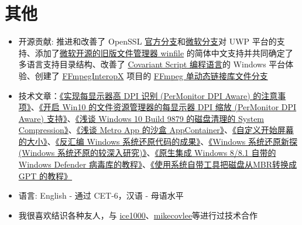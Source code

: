 \documentclass{resume}
\begin{document}
\section{其他}
\begin{itemize}[parsep=0.25ex]

  \item 开源贡献: 推进和改善了 OpenSSL \href{https://github.com/openssl/openssl/pulls?q=is:pr+author:MouriNaruto+}{官方分支}和\href{https://github.com/microsoft/openssl/pulls?q=is:pr+author:MouriNaruto+}{微软分支}对 UWP 平台的支持、添加了\href{https://github.com/microsoft/winfile/pulls?q=is:pr+author:MouriNaruto+}{微软开源的旧版文件管理器 winfile} 的简体中文支持并共同确定了多语言支持目录结构、改善了 \href{https://github.com/covscript/covscript/pulls?q=is:pr+author:MouriNaruto+}{Covariant Script 编程语言}的 Windows 平台体验、创建了 \href{https://github.com/ffmpeginteropx/FFmpegInteropX/pulls?q=is:pr+author:MouriNaruto+}{FFmpegInteropX} 项目的 \href{https://github.com/ffmpeginteropx/FFmpegInteropX/tree/FFmpegUniversal}{FFmpeg 单动态链接库文件分支}
  
  \item 技术文章：\href{https://www.52pojie.cn/thread-512713-1-1.html}{《实现每显示器高 DPI 识别 (Per\-Monitor DPI Aware) 的注意事项》}、\href{https://www.52pojie.cn/thread-506556-1-1.html}{《开启 Win10 的文件资源管理器的每显示器 DPI 缩放 (Per\-Monitor DPI Aware) 支持》}、\href{http://bbs.pcbeta.com/viewthread-1567726-1-1.html}{《浅谈 Windows 10 Build 9879 的磁盘清理的 System Compression》}、\href{http://bbs.pcbeta.com/viewthread-1611980-1-1.html}{《浅谈 Metro App 的沙盒 AppContainer》}、\href{http://bbs.pcbeta.com/viewthread-1524688-1-1.html}{《自定义开始屏幕的大小》}、\href{http://bbs.pcbeta.com/viewthread-1535789-1-1.html}{《反汇编 Windows 系统还原代码的成果》}、\href{http://bbs.pcbeta.com/viewthread-1507617-1-1.html}{《Windows 系统还原新探 (Windows 系统还原的较深入研究)》}、\href{http://bbs.pcbeta.com/viewthread-1519551-1-1.html}{《原生集成 Windows 8/8.1 自带的 Windows Defender 病毒库的教程》}、\href{http://bbs.pcbeta.com/viewthread-1488892-1-1.html}{《使用系统自带工具把磁盘从MBR转换成 GPT 的教程》}
  
  \item 语言: English - 通过 CET-6，汉语 - 母语水平
  
  \item 我很喜欢结识各种友人，与 \href{https://github.com/ice1000/}{ice1000}、\href{https://github.com/mikecovlee}{mikecovlee}等进行过技术合作

\end{itemize}
\end{document}
